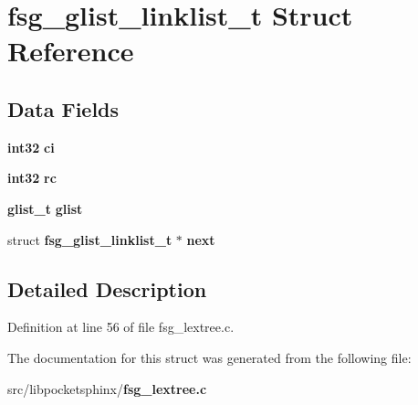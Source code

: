 \section{fsg\-\_\-glist\-\_\-linklist\-\_\-t \-Struct \-Reference}
\label{structfsg__glist__linklist__t}
\subsection*{\-Data \-Fields}
\begin{DoxyCompactItemize}
\item 
{\bf int32} {\bfseries ci}\label{structfsg__glist__linklist__t_aee967d5f9700245d9bf02f22d730fe86}

\item 
{\bf int32} {\bfseries rc}\label{structfsg__glist__linklist__t_ad5fd289a4223f35f2f87b974cbc6bd81}

\item 
{\bf glist\-\_\-t} {\bfseries glist}\label{structfsg__glist__linklist__t_a2bc9d5102b5a082d3ece84ac4dca51be}

\item 
struct {\bf fsg\-\_\-glist\-\_\-linklist\-\_\-t} $\ast$ {\bfseries next}\label{structfsg__glist__linklist__t_ae6b27b46998d4c2ee400ef828c3cbe57}

\end{DoxyCompactItemize}


\subsection{\-Detailed \-Description}


\-Definition at line 56 of file fsg\-\_\-lextree.\-c.



\-The documentation for this struct was generated from the following file\-:\begin{DoxyCompactItemize}
\item 
src/libpocketsphinx/{\bf fsg\-\_\-lextree.\-c}\end{DoxyCompactItemize}

